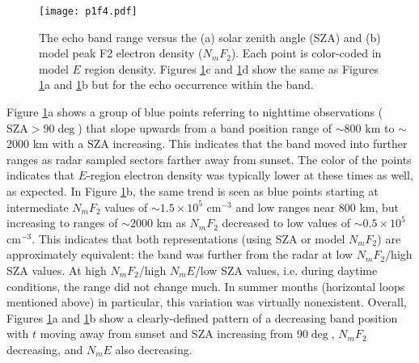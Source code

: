 \begin{figure}
	\centering
	\texttt{[image: p1f4.pdf]}
	\caption[Band position and occurrence versus SZA and \(N_mF_2\)]{The echo band range versus the (a) solar zenith angle (SZA) and (b) model peak F2 electron density (\(N_mF_2\)). Each point is color-coded in model \(E\) region density. Figures \ref{fig:scatter}c and \ref{fig:scatter}d show the same as Figures \ref{fig:scatter}a and \ref{fig:scatter}b but for the  echo occurrence within the band.}
	\label{fig:scatter}
\end{figure}

Figure \ref{fig:scatter}a shows a group of blue points referring to nighttime observations (\(\text{SZA}>90\deg\)) that slope upwards from a band position range of \(\sim\)800 km to \(\sim\)2000 km with a SZA increasing. This indicates that the band moved into further ranges as radar sampled sectors farther away from sunset. The color of the points indicates that \(E\)-region electron density was typically lower at these times as well, as expected. In Figure \ref{fig:scatter}b, the same trend is seen as blue points starting at intermediate \(N_mF_2\) values of \(\sim1.5 \times 10^5\) cm\(^{-3}\) and low ranges near 800 km, but increasing to ranges of \(\sim\)2000 km as \(N_mF_2\) decreased to low values of \(\sim0.5 \times 10^5\) cm\(^{-3}\). This indicates that both representations (using SZA or model \(N_mF_2\)) are approximately equivalent: the band was further from the radar at low \(N_mF_2\)/high SZA values. At high \(N_mF_2\)/high \(N_mE\)/low SZA values, i.e. during daytime conditions, the range did not change much. In summer months (horizontal loops mentioned above) in particular, this variation was virtually nonexistent. Overall, Figures \ref{fig:scatter}a and \ref{fig:scatter}b show a clearly-defined pattern of a decreasing band position with \(t\) moving away from sunset and SZA increasing from 90\(\deg\), \(N_mF_2\) decreasing, and \(N_mE\) also decreasing.

